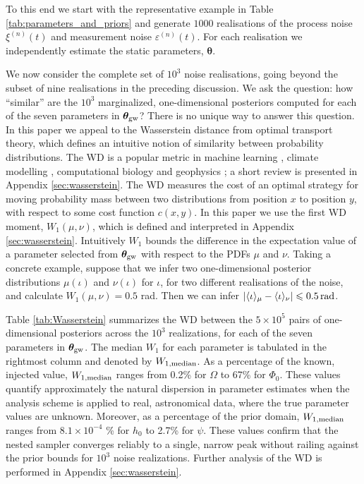 \documentclass[fleqn,usenatbib,useAMS]{mnras}
\begin{document}
To this end we start with the representative example in Table \ref{tab:parameters_and_priors} and generate $1000$ realisations of the process noise $\xi^{(n)}(t)$ and measurement noise $\varepsilon^{(n)}(t)$. For each realisation we independently estimate the static parameters, $\boldsymbol{\theta}$. 



We now consider the complete set of $10^3$ noise realisations, going beyond the subset of nine realisations in the preceding discussion. We ask the question: how ``similar'' are the $10^3$ marginalized, one-dimensional posteriors computed for each of the seven parameters in ${\boldsymbol{\theta}}_{\rm gw}$? There is no unique way to answer this question. In this paper we appeal to the Wasserstein distance \citep[WD;][]{Wasserstein,Villani2009} from optimal transport theory, which defines an intuitive notion of similarity between probability distributions. The WD is a popular metric in machine learning \citep{2017arXiv170107875A}, climate modelling \citep{2022JCli...35.1215P,2023QJRMS.149..843K}, computational biology \citep{GONZALEZDELGADO2023168053} and geophysics \citep{2023GeoRL..5003880M}; a short review is presented in Appendix \ref{sec:wasserstein}. The WD measures the cost of an optimal strategy for moving probability mass between two distributions from position $x$ to position $y$, with respect to some cost function $c(x,y)$. In this paper we use the first WD moment, $W_1(\mu,\nu)$, which is defined and interpreted in Appendix \ref{sec:wasserstein}. Intuitively $W_1$ bounds the difference in the expectation value of a parameter selected from ${\boldsymbol{\theta}}_{\rm gw}$ with respect to the PDFs $\mu$ and $\nu$. Taking a concrete example, suppose that we infer two one-dimensional posterior distributions $\mu(\iota)$ and $\nu(\iota)$ for $\iota$, for two different realisations of the noise, and calculate $W_1(\mu, \nu) =0.5$ rad. Then we can infer $| \langle \iota \rangle_\mu - \langle \iota \rangle_\nu | \leq 0.5 \, {\rm rad}$. \newline 


Table \ref{tab:Wasserstein} summarizes the WD between the $5\times 10^5$ pairs of one-dimensional posteriors across the $10^3$ realizations, for each of the seven parameters in ${\boldsymbol{\theta}}_{\rm gw}$. The median $W_1$ for each parameter is tabulated in the rightmost column and denoted by $W_{1,{\rm median}}$. As a percentage of the known, injected value, $W_{\rm 1,median}$ ranges from  0.2\% for $\Omega$ to 67\% for $\Phi_0$. These values quantify approximately the natural dispersion in parameter estimates when the analysis scheme is applied to real, astronomical data, where the true parameter values are unknown. Moreover, as a percentage of the prior domain, $W_{\rm 1,median}$ ranges from $8.1 \times 10^{-4}$ \% for $h_0$ to 2.7\% for $\psi$. These values confirm that the nested sampler converges reliably to a single, narrow peak without railing against the prior bounds for $10^3$ noise realizations. Further analysis of the WD is performed in Appendix \ref{sec:wasserstein}.
\end{document}
